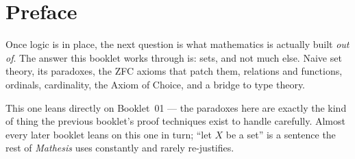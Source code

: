 \chapter*{Preface}

Once logic is in place, the next question is what mathematics is
actually built \textit{out of}. The answer this booklet works through is:
sets, and not much else. Naive set theory, its paradoxes, the ZFC axioms
that patch them, relations and functions, ordinals, cardinality, the
Axiom of Choice, and a bridge to type theory.

This one leans directly on Booklet~01 --- the paradoxes here are exactly
the kind of thing the previous booklet's proof techniques exist to
handle carefully. Almost every later booklet leans on this one in turn;
``let $X$ be a set'' is a sentence the rest of \textit{Mathesis} uses
constantly and rarely re-justifies.
